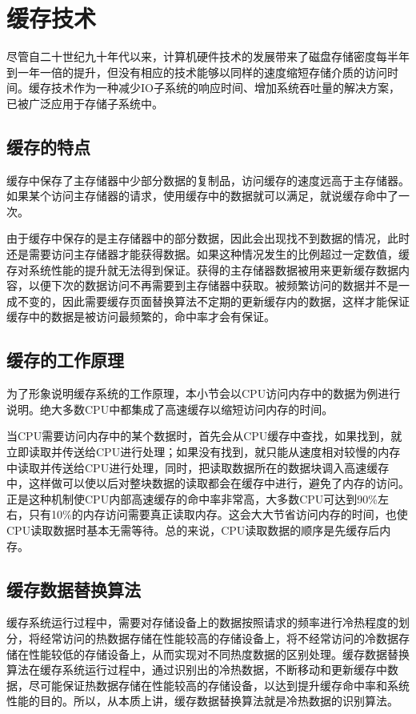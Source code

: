 \section{缓存技术}
\label{sec:cache_tech}

尽管自二十世纪九十年代以来，计算机硬件技术的发展带来了磁盘存储密度每半年到一年一倍的提升，但没有相应的技术能够以同样的速度缩短存储介质的访问时间。缓存技术作为一种减少IO子系统的响应时间、增加系统吞吐量的解决方案，已被广泛应用于存储子系统中。

\subsection{缓存的特点}
缓存中保存了主存储器中少部分数据的复制品，访问缓存的速度远高于主存储器。如果某个访问主存储器的请求，使用缓存中的数据就可以满足，就说缓存命中了一次。

由于缓存中保存的是主存储器中的部分数据，因此会出现找不到数据的情况，此时还是需要访问主存储器才能获得数据。如果这种情况发生的比例超过一定数值，缓存对系统性能的提升就无法得到保证。获得的主存储器数据被用来更新缓存数据内容，以便下次的数据访问不再需要到主存储器中获取。被频繁访问的数据并不是一成不变的，因此需要缓存页面替换算法不定期的更新缓存内的数据，这样才能保证缓存中的数据是被访问最频繁的，命中率才会有保证。

\subsection{缓存的工作原理}
为了形象说明缓存系统的工作原理，本小节会以CPU访问内存中的数据为例进行说明。绝大多数CPU中都集成了高速缓存以缩短访问内存的时间。

当CPU需要访问内存中的某个数据时，首先会从CPU缓存中查找，如果找到，就立即读取并传送给CPU进行处理；如果没有找到，就只能从速度相对较慢的内存中读取并传送给CPU进行处理，同时，把读取数据所在的数据块调入高速缓存中，这样做可以使以后对整块数据的读取都会在缓存中进行，避免了内存的访问。正是这种机制使CPU内部高速缓存的命中率非常高，大多数CPU可达到90\%左右，只有10\%的内存访问需要真正读取内存。这会大大节省访问内存的时间，也使CPU读取数据时基本无需等待。总的来说，CPU读取数据的顺序是先缓存后内存。

\subsection{缓存数据替换算法}
缓存系统运行过程中，需要对存储设备上的数据按照请求的频率进行冷热程度的划分，将经常访问的热数据存储在性能较高的存储设备上，将不经常访问的冷数据存储在性能较低的存储设备上，从而实现对不同热度数据的区别处理。缓存数据替换算法在缓存系统运行过程中，通过识别出的冷热数据，不断移动和更新缓存中数据，尽可能保证热数据存储在性能较高的存储设备，以达到提升缓存命中率和系统性能的目的。所以，从本质上讲，缓存数据替换算法就是冷热数据的识别算法。


